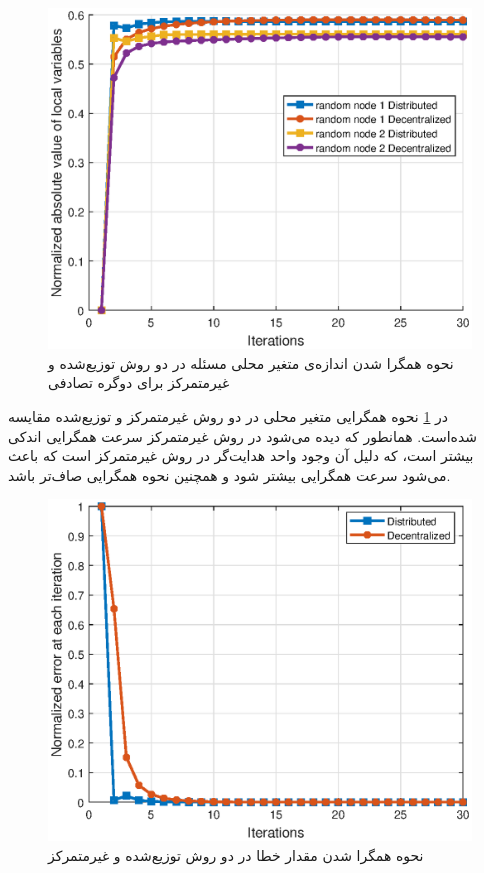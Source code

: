 \begin{figure}[h!]
	\centerline{\includegraphics[width=12cm]{graphics/4-heuristic-dist/distributed_decent_local_vars_convergence}}
	\caption{نحوه‌ همگرا شدن اندازه‌ی متغیر  محلی مسئله در دو روش توزیع‌شده و غیرمتمرکز برای دوگره تصادفی}
	\label{fig:distributed_decent_local_vars_convergence}
\end{figure}

	در \cref{fig:distributed_decent_local_vars_convergence}	نحوه‌ همگرایی متغیر محلی در دو روش غیرمتمرکز و توزیع‌شده مقایسه شده‌است. همانطور که دیده می‌شود در روش غیرمتمرکز سرعت همگرایی اندکی بیشتر است، که دلیل آن وجود واحد هدایت‌گر در روش غیرمتمرکز است که باعث می‌شود سرعت همگرایی بیشتر شود و همچنین نحوه همگرایی صاف‌تر باشد. 

\begin{figure}[h!]
	\centerline{\includegraphics[width=12cm]{graphics/4-heuristic-dist/error_convergence_dist_decent}}
	\caption{نحوه همگرا شدن مقدار خطا در دو روش توزیع‌شده و غیرمتمرکز}
	\label{fig:error_convergence_dist_decent}
\end{figure}


